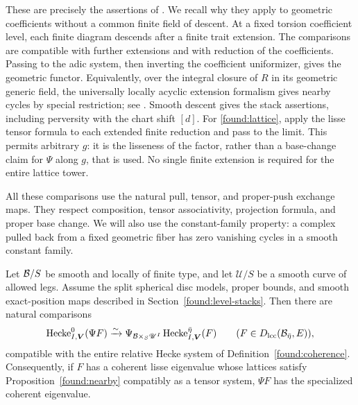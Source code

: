 These are precisely the assertions of \cite[Proposition~2.1]{CT}.
We recall why they apply to geometric coefficients without a common
finite field of descent.  At a fixed torsion coefficient level, each
finite diagram descends after a finite trait extension.  The comparisons
are compatible with further extensions and with reduction of the
coefficients.  Passing to the adic system, then inverting the coefficient
uniformizer, gives the geometric functor.  Equivalently, over the
integral closure of $R$ in its geometric generic field, the universally
locally acyclic extension formalism gives nearby cycles by special
restriction; see \cite[Theorems~4.1 and~6.7]{HS}.  Smooth descent gives
the stack assertions, including perversity with the chart shift $[d]$.
For \eqref{found:lattice}, apply the lisse tensor formula to each
extended finite reduction and pass to the limit.  This permits arbitrary
$g$: it is the lisseness of the factor, rather than a base-change claim
for $\Psi$ along $g$, that is used.  No single finite extension is
required for the entire lattice tower.

All these comparisons use the natural pull, tensor, and proper-push
exchange maps.  They respect composition, tensor associativity,
projection formula, and proper base change.  We will also use the
constant-family property: a complex pulled back from a fixed geometric
fiber has zero vanishing cycles in a smooth constant family.

\begin{proposition}
\label{found:hecke-specialization}
Let $\mathcal B/S$ be smooth and locally of finite type, and let
$\mathscr U/S$ be a smooth curve of allowed legs.  Assume the split
spherical disc models, proper bounds, and smooth exact-position maps
described in Section~\ref{found:level-stacks}.  Then there are natural
comparisons
\[
 \operatorname{Hecke}^0_{I,\boldsymbol V}(\Psi F)
   \xrightarrow{\sim}
 \Psi_{\mathcal B\times_S\mathscr U^I}
             \operatorname{Hecke}^{\bar\eta}_{I,\boldsymbol V}(F)
 \qquad(F\in D_{\mathrm{lcc}}(\mathcal B_{\bar\eta},E)),
\]
compatible with the entire relative Hecke system of
Definition~\ref{found:coherence}.  Consequently, if $F$ has a coherent
lisse eigenvalue whose lattices satisfy Proposition~\ref{found:nearby}
compatibly as a tensor system, $\Psi F$ has the specialized coherent
eigenvalue.
\end{proposition}

